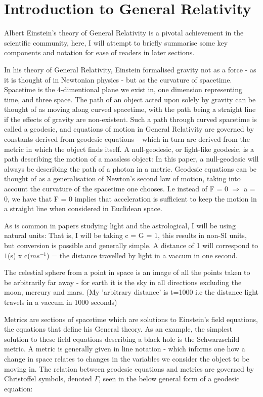 \documentclass[oneside,openright,frontopenright]{dmathesis}
\begin{document}
\chapter{Introduction to General Relativity}
	Albert Einstein’s theory of General Relativity is a pivotal achievement in the scientific community, here, I will attempt to briefly summarise some key components and notation for ease of readers in later sections.

	In his theory of General Relativity, Einstein formalised gravity not as a force - as it is thought of in Newtonian physics - but as the curvature of spacetime. Spacetime is the 4-dimentional plane we exist in, one dimension representing time, and three space. The path of an object acted upon solely by gravity can be thought of as moving along curved spacetime, with the path being a straight line if the effects of gravity are non-existent. Such a path through curved spacetime is called a geodesic, and equations of motion in General Relativity are governed by constants derived from geodesic equations – which in turn are derived from the metric in which the object finds itself. A null-geodesic, or light-like geodesic, is a path describing the motion of a massless object: In this paper, a null-geodesic will always be describing the path of a photon in a metric. Geodesic equations can be thought of as a generalisation of Newton's second law of motion, taking into account the curvature of the spacetime one chooses. I.e instead of F = 0 $\Rightarrow$ a = 0, we have that F = 0 implies that acceleration is sufficient to keep the motion in a straight line when considered in Euclidean space.

	As is common in papers studying light and the astrological, I will be using natural units: That is, I will be taking c = G = 1, this results in non-SI units, but conversion is possible and generally simple. A distance of 1 will correspond to $1$(s) x c($ms^{-1}$) = the distance travelled by light in a vaccum in one second.

	The celestial sphere from a point in space is an image of all the points taken to be arbitrarily far away - for earth it is the sky in all directions excluding the moon, mercury and mars. (My 'arbitrary distance' is t=1000 i.e the distance light travels in a vaccum in 1000 seconds)

	Metrics are sections of spacetime which are solutions to Einstein’s field equations, the equations that define his General theory. As an example, the simplest solution to these field equations describing a black hole is the Schwarzschild metric. A metric is generally given in line notation - which informs one how a change in space relates to changes in the variables we consider the object to be moving in. The relation between geodesic equations and metrics are governed by Christoffel symbols, denoted $\Gamma$, seen in the below general form of a geodesic equation\cite{geodesic}:  
\end{document}
